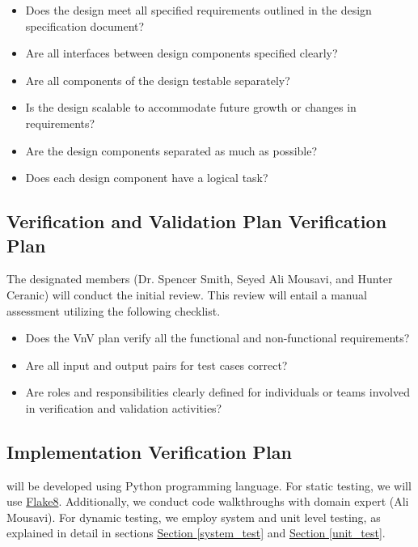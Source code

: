 \documentclass[12pt, titlepage]{article}
\begin{document}
\begin{itemize}\renewcommand{\labelitemi}{\scriptsize$\square$}
  \item Does the design meet all specified requirements outlined in the design specification document?
  \item Are all interfaces between design components specified clearly?
  \item Are all components of the design testable separately?
  \item Is the design scalable to accommodate future growth or changes in requirements?
  \item Are the design components separated as much as possible?
  \item Does each design component have a logical task?
\end{itemize}



\subsection{Verification and Validation Plan Verification Plan}
The designated members (Dr. Spencer Smith, Seyed Ali Mousavi, and Hunter Ceranic) 
will conduct the initial review. This review will entail 
a manual assessment utilizing the following checklist.

\begin{itemize}\renewcommand{\labelitemi}{\scriptsize$\square$}
  \item Does the VnV plan verify all the functional and 
        non-functional requirements?
  \item Are all input and output pairs for test cases correct?
  \item Are roles and responsibilities clearly defined for individuals 
        or teams involved in verification and validation activities?
\end{itemize}




\subsection{Implementation Verification Plan}
\progname{} will be developed using Python programming language. 
For static testing, we will use \href{https://flake8.pycqa.org/}{Flake8}. 
Additionally, we conduct code 
walkthroughs with domain expert (Ali Mousavi). For dynamic testing, 
we employ system and unit level testing, as explained 
in detail in sections 
\hyperref[system_test]{Section \ref*{system_test}} 
and \hyperref[unit_test]{Section \ref*{unit_test}}.
\end{document}
